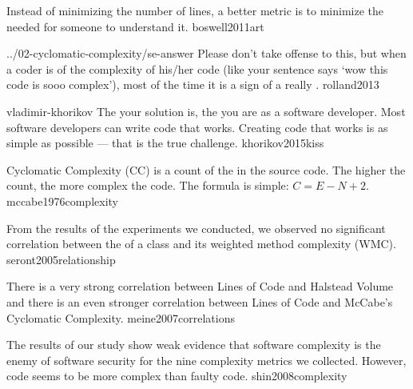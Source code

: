 \documentclass{article}
\begin{document}

  {Instead of minimizing the number of lines, a better metric is to minimize the  needed for someone to understand it.}
  {boswell2011art}


\lnQuote
  {../02-cyclomatic-complexity/se-answer}
  {Please don't take offense to this, but when a coder is  of the complexity of his/her code (like your sentence says `wow this code is sooo complex'), most of the time it is a sign of a really .}
  {rolland2013}

\lnQuote
  {vladimir-khorikov}
  {The  your solution is, the  you are as a software developer. Most software developers can write code that works. Creating code that works  is as simple as possible --- that is the true challenge.}
  {khorikov2015kiss}


  {Cyclomatic Complexity (CC) is a count of the  in the source code. The higher the count, the more complex the code. The formula is simple: \(C=E-N+2\).}
  {mccabe1976complexity}



  {From the results of the experiments we conducted, we observed no significant correlation between the  of a class and its weighted method complexity (WMC).}
  {seront2005relationship}

  {There is a very strong correlation between Lines of Code and Halstead Volume and there is an even stronger correlation between Lines of Code and McCabe's Cyclomatic Complexity.}
  {meine2007correlations}

  {The results of our study show weak evidence that software complexity is the enemy of software security for the nine complexity metrics we collected. However,  code seems to be more complex than faulty code.}
  {shin2008complexity}
\end{document}
